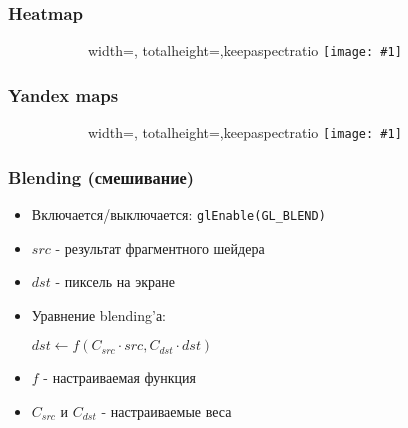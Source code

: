 \documentclass{beamer}
\newcommand{\slideimage}[1]{
  \begin{figure}
    \begin{adjustbox}{width=\textwidth, totalheight=\textheight-2\baselineskip-2\baselineskip,keepaspectratio}
      \texttt{[image: \#1]}
    \end{adjustbox}
  \end{figure}
}
\begin{document}

\begin{frame}
\frametitle{Heatmap}
\begin{figure}
\slideimage{heatmap.jpg}
\end{figure}
\end{frame}


\begin{frame}
\frametitle{Yandex maps}
\begin{figure}
\slideimage{yandex-maps.jpg}
\end{figure}
\end{frame}


\begin{frame}[fragile]
\frametitle{Blending (смешивание)}
\begin{itemize}
\item Включается/выключается: \verb|glEnable(GL_BLEND)|
\pause
\item \begin{math}src\end{math} - результат фрагментного шейдера
\item \begin{math}dst\end{math} - пиксель на экране
\item Уравнение blending'а:
\begin{center}
\begin{math}
dst \leftarrow f(C_{src} \cdot src, C_{dst} \cdot dst)
\end{math}
\end{center}
\pause
\item \begin{math}f\end{math} - настраиваемая функция
\item \begin{math}C_{src}\end{math} и \begin{math}C_{dst}\end{math} - настраиваемые веса
\end{itemize}
\end{frame}
\end{document}
